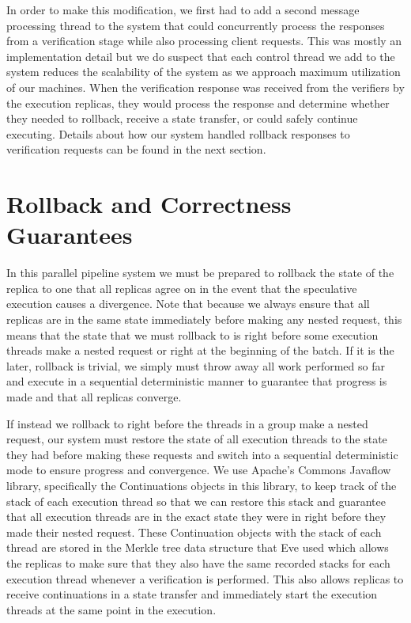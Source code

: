 \documentclass[11pt, oneside]{report}
\begin{document}
In order to make this modification, we first had to add a second message processing thread to the system that could concurrently process the responses from a verification stage while also processing client requests. This was mostly an implementation detail but we do suspect that each control thread we add to the system reduces the scalability of the system as we approach maximum utilization of our machines. When the verification response was received from the verifiers by the execution replicas, they would process the response and determine whether they needed to rollback, receive a state transfer, or could safely continue executing. Details about how our system handled rollback responses to verification requests can be found in the next section.

\section{Rollback and Correctness Guarantees}

In this parallel pipeline system we must be prepared to rollback the state of the replica to one that all replicas agree on in the event that the speculative execution causes a divergence. Note that because we always ensure that all replicas are in the same state immediately before making any nested request, this means that the state that we must rollback to is right before some execution threads make a nested request or right at the beginning of the batch. If it is the later, rollback is trivial, we simply must throw away all work performed so far and execute in a sequential deterministic manner to guarantee that progress is made and that all replicas converge.

If instead we rollback to right before the threads in a group make a nested request, our system must restore the state of all execution threads to the state they had before making these requests and switch into a sequential deterministic mode to ensure progress and convergence. We use Apache's Commons Javaflow library, specifically the Continuations objects in this library, to keep track of the stack of each execution thread so that we can restore this stack and guarantee that all execution threads are in the exact state they were in right before they made their nested request. These Continuation objects with the stack of each thread are stored in the Merkle tree data structure that Eve used which allows the replicas to make sure that they also have the same recorded stacks for each execution thread whenever a verification is performed. This also allows replicas to receive continuations in a state transfer and immediately start the execution threads at the same point in the execution. 
\end{document}
